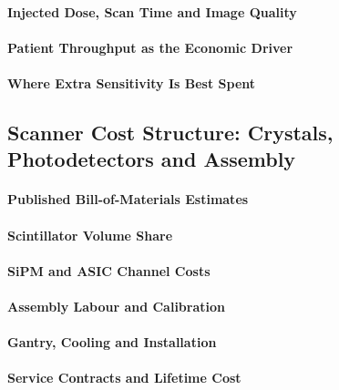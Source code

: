 \paragraph{Injected Dose, Scan Time and Image Quality}

\paragraph{Patient Throughput as the Economic Driver}

\paragraph{Where Extra Sensitivity Is Best Spent}

\subsection{Scanner Cost Structure: Crystals, Photodetectors and Assembly}
\label{sec:cost-structure}

\paragraph{Published Bill-of-Materials Estimates}

\paragraph{Scintillator Volume Share}

\paragraph{SiPM and ASIC Channel Costs}

\paragraph{Assembly Labour and Calibration}

\paragraph{Gantry, Cooling and Installation}

\paragraph{Service Contracts and Lifetime Cost}

